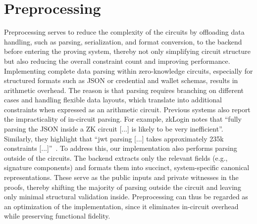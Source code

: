 \section{Preprocessing}
\label{sec:preprocessing}
Preprocessing serves to reduce the complexity of the circuits by offloading data handling, such as parsing, serialization, and format conversion, to the backend before entering the proving system, thereby not only simplifying circuit structure but also reducing the overall constraint count and improving performance. Implementing complete data parsing within zero-knowledge circuits, especially for structured formats such as JSON or credential and wallet schemas, results in arithmetic overhead. The reason is that parsing requires branching on different cases and handling flexible data layouts, which translate into additional constraints when expressed as an arithmetic circuit. Previous systems also report the impracticality of in-circuit parsing. For example, zkLogin notes that “fully parsing the JSON inside a ZK circuit [...] is likely to be very inefficient”. Similarly, they highlight that “\acrshort{jwt} parsing [...] takes approximately 235k constraints [...]”~\cite{Baldimtsi_2024}. To address this, our implementation also performs parsing outside of the circuits. The backend extracts only the relevant fields (e.g., signature components) and formats them into succinct, system-specific canonical representations. These serve as the public inputs and private witnesses in the proofs, thereby shifting the majority of parsing outside the circuit and leaving only minimal structural validation inside. Preprocessing can thus be regarded as an optimization of the implementation, since it eliminates in-circuit overhead while preserving functional fidelity.

